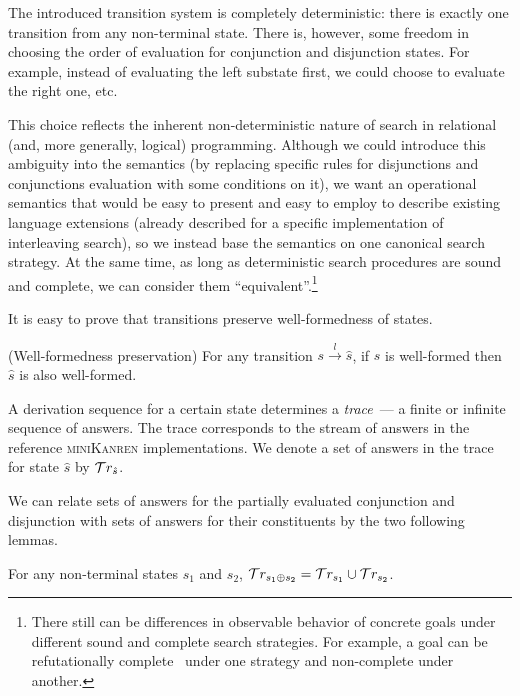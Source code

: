 The introduced transition system is completely deterministic: there is exactly one transition from any non-terminal state.
There is, however, some freedom in choosing the order of evaluation for conjunction and
disjunction states. For example, instead of evaluating the left substate first, we could choose to evaluate the right one, etc.
\begin{comment}
In each concrete case, we would
end up with a different (but still deterministic) system that would prescribe different semantics to a concrete goal.
\end{comment}
This choice reflects the inherent non-deterministic nature of search in relational (and, more generally, logical) programming.
Although we could introduce this ambiguity into the semantics (by replacing specific rules for disjunctions and conjunctions evaluation with some conditions on it), we want an operational semantics that would be easy to present and easy to employ to describe existing language extensions (already described for a specific implementation of interleaving search), so we instead base the semantics on one canonical search strategy.
At the same time, as long as deterministic search procedures are sound and complete, we can consider them ``equivalent''.\footnote{There still can be differences in observable behavior of concrete goals under different sound and complete search strategies.
For example, a goal can be refutationally complete~\cite{WillThesis} under one strategy and non-complete under another.}

It is easy to prove that transitions preserve well-formedness of states.

\begin{lemma}{(Well-formedness preservation)}
\label{lem:well_formedness_preservation}
For any transition $s \xrightarrow{l} \hat{s}$, if $s$ is well-formed then $\hat{s}$ is also well-formed.
\end{lemma}

A derivation sequence for a certain state determines a \emph{trace}~--- a finite or infinite sequence of answers. The trace corresponds to the stream of answers
in the reference \textsc{miniKanren} implementations. We denote a set of answers in the trace for state $\hat{s}$ by $\mathcal{T}r_{\hat{s}}$.

We can relate sets of answers for the partially evaluated conjunction and disjunction with sets of answers for their constituents by the two following lemmas.

\begin{lemma}
\label{lem:sum_answers}
For any non-terminal states $s_1$ and $s_2$, $\mathcal{T}r_{s_1 \oplus s_2} = \mathcal{T}r_{s_1} \cup \mathcal{T}r_{s_2}$.
\end{lemma}

